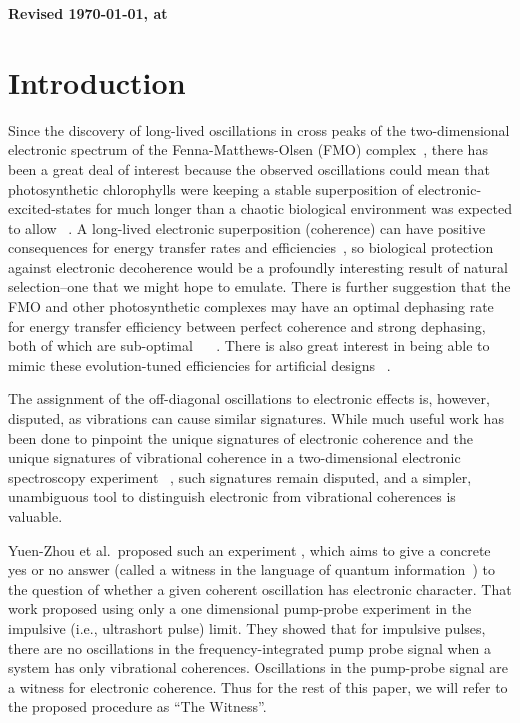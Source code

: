 \textbf{Revised \today , at \currenttime}


\section{Introduction}


Since the discovery of long-lived oscillations in cross peaks of the two-dimensional electronic spectrum of the Fenna-Matthews-Olsen (FMO) complex~\cite{FMO1}, there has been a great deal of interest because the observed oscillations could mean that photosynthetic chlorophylls were keeping a stable superposition of electronic-excited-states for much longer than a chaotic biological environment was expected to allow ~\cite{FMO2,Panitchayangkoon2011,Lambert2012}.
%
A long-lived electronic superposition (coherence) can have positive consequences for energy transfer rates and efficiencies~\cite{FMO1}, so biological protection against electronic decoherence would be a profoundly interesting result of natural selection--one that we might hope to emulate. There is further suggestion that the FMO and other photosynthetic complexes may have an optimal dephasing rate for energy transfer efficiency between perfect coherence and strong dephasing, both of which are sub-optimal ~\cite{energyTransfer} ~\cite{Panitchayangkoon2011,Fidler2013,Collini2010}.  There is also great interest in being able to mimic these evolution-tuned efficiencies for artificial designs ~\cite{Creatore2013}.

The assignment of the off-diagonal oscillations to electronic effects is, however, disputed, as vibrations can cause similar signatures.  While much useful work has been done to pinpoint the  unique signatures of electronic coherence and the unique signatures of vibrational coherence in a two-dimensional electronic spectroscopy experiment ~\cite{FMO2,mech2,mech3,mech1,mech4,Halpin2014,Chenu2013}, such signatures remain disputed, and a simpler, unambiguous tool to distinguish electronic from vibrational coherences is valuable.

Yuen-Zhou et al.\ proposed such an experiment \cite{witness}, which aims to give a concrete yes or no answer (called a witness in the language of quantum information~\cite{Chuang2005}) to the question of whether a given coherent oscillation has electronic character.  That work proposed using only a one dimensional pump-probe experiment in the impulsive (i.e., ultrashort pulse) limit.  They showed that for impulsive pulses, there are no oscillations in the frequency-integrated pump probe signal when a system has only vibrational coherences. Oscillations in the pump-probe signal  are a witness for electronic coherence.  Thus for the rest of this paper, we will refer to the proposed procedure as ``The Witness''.

